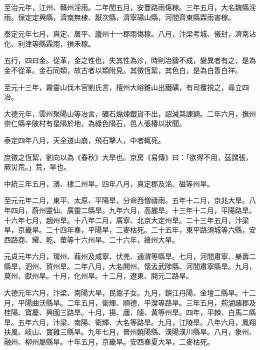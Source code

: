 \begin{pinyinscope}
 至治元年，江州、贛州淫雨。二年閏五月，安豐路雨傷稼。三年五月，大名魏縣淫雨。保定定興縣，濟南無棣、厭次縣，濟寧碭山縣，河間齊東縣霖雨害稼。



 泰定元年七月，真定、廣平、廬州十一郡雨傷稼。八月，汴梁考城、儀封，濟南沾化、利津等縣霖雨，損禾稼。



 五行，四曰金。從革，金之性也，失其性為沴，時則冶鑄不成，變異者有之，是為金不從革。金石同類，故古者以類附見。其徵恆絜，其色白，是為白眚白祥。



 至元十三年，霧靈山伐木官劉氏言，檀州大峪錐山出鐵礦，有司覆視之，尋立四冶。



 大德元年，雲州聚陽山等冶言，礦石煽煉銀貨不出，詔減其課額。二年六月，撫州崇仁縣辛陂村有星隕於地，為綠色隕石，邑人張椿以狀聞。



 泰定四年八月，天全道山崩，飛石擊人，中者輒死。



 庶徵之恆絜，劉向以為《春秋》大旱也。京房《易傳》曰：「欲得不用，茲謂張，厥災荒。」荒，旱也。



 中統三年五月，濱、棣二州旱。四年八月，真定郡及洺、磁等州旱。



 至元元年二月，東平、太原、平陽旱，分命西僧禱雨。五年十二月，京兆大旱。八年四月，蔚州靈仙、廣靈二縣旱。九年六月，高麗旱。十三年十二月，平陽路旱。十六年七月，趙州旱。十八年二月，廣寧、北京大定州旱。二十三年五月，汴梁旱，京畿旱。二十四年春，平陽旱，二麥枯死。二十五年，東平路須城等六縣，安西路商、耀、乾、華等十六州旱。二十六年，絳州大旱。



 元貞元年六月，環州、葭州及咸寧、伏羌、通渭等縣旱。七月，河間肅寧、樂壽二縣旱，泗州、賀州旱。二年八月，大名開州、懷孟武陟縣、河間肅寧縣旱。九月，莫州、獻州旱。十月，化州旱。十二月，遼東、開元二路旱。



 大德元年六月，汴梁、南陽大旱，民鬻子女。九月，鎮江丹陽、金壇二縣旱。十二月，平陽曲沃縣旱。二年五月，衛輝、順德、平灤等路旱。三年五月，荊湖諸郡及桂陽、寶慶、興國三路旱。十月，揚、廬、隨、黃等州旱。四年，平棘、白馬二縣旱。五年六月，汴梁、南陽、衛輝、大名等路旱。九月，江陵旱。八年六月，鳳翔扶風、岐山、寶雞三縣旱。九年七月，晉州饒陽縣、漢陽漢川縣旱。八月，象州、融州、柳州屬縣旱。十年五月，京畿旱。安西春夏大旱，二麥枯死。




\end{pinyinscope}
